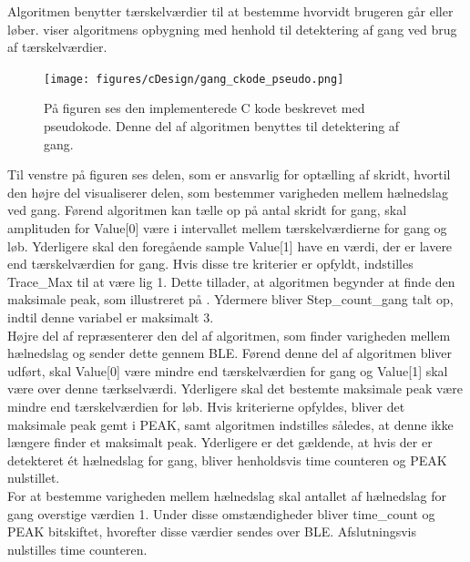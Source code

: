 Algoritmen benytter tærskelværdier til at bestemme hvorvidt brugeren går eller løber.  viser algoritmens opbygning med henhold til detektering af gang ved brug af tærskelværdier.
\begin{figure}[H]
	\centering
	\texttt{[image: figures/cDesign/gang\_ckode\_pseudo.png]}
	\caption{På figuren ses den implementerede C kode beskrevet med pseudokode. Denne del af algoritmen benyttes til detektering af gang.}
	\label{fig:gang_pseudo}
\end{figure} \vspace{-0.5cm}
Til venstre på figuren ses delen, som er ansvarlig for optælling af skridt, hvortil den højre del visualiserer delen, som bestemmer varigheden mellem hælnedslag ved gang. Førend algoritmen kan tælle op på antal skridt for gang, skal amplituden for Value[0] være i intervallet mellem tærskelværdierne for gang og løb. Yderligere skal den foregående sample Value[1] have en værdi, der er lavere end tærskelværdien for gang. Hvis disse tre kriterier er opfyldt, indstilles Trace\_Max til at være lig 1. Dette tillader, at algoritmen begynder at finde den maksimale peak, som illustreret på . Ydermere bliver Step\_count\_gang talt op, indtil denne variabel er maksimalt 3. \\
Højre del af  repræsenterer den del af algoritmen, som finder varigheden mellem hælnedslag og sender dette gennem BLE. Førend denne del af algoritmen bliver udført, skal Value[0] være mindre end tærskelværdien for gang og Value[1] skal være over denne tærkselværdi. Yderligere skal det bestemte maksimale peak være mindre end tærskelværdien for løb. Hvis kriterierne opfyldes, bliver det maksimale peak gemt i PEAK, samt algoritmen indstilles således, at denne ikke længere finder et maksimalt peak. Yderligere er det gældende, at hvis der er detekteret ét hælnedslag for gang, bliver henholdsvis time counteren og PEAK nulstillet. \\
For at bestemme varigheden mellem hælnedslag skal antallet af hælnedslag for gang overstige værdien 1. Under disse omstændigheder bliver time\_count og PEAK bitskiftet, hvorefter disse værdier sendes over BLE. Afslutningsvis nulstilles time counteren.

